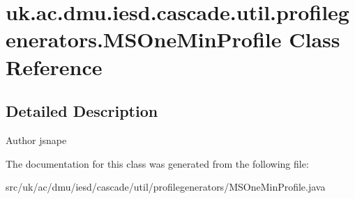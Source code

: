 \hypertarget{classuk_1_1ac_1_1dmu_1_1iesd_1_1cascade_1_1util_1_1profilegenerators_1_1_m_s_one_min_profile}{\section{uk.\-ac.\-dmu.\-iesd.\-cascade.\-util.\-profilegenerators.\-M\-S\-One\-Min\-Profile Class Reference}
\label{classuk_1_1ac_1_1dmu_1_1iesd_1_1cascade_1_1util_1_1profilegenerators_1_1_m_s_one_min_profile}
}


\subsection{Detailed Description}
\begin{DoxyAuthor}{Author}
jsnape 
\end{DoxyAuthor}


The documentation for this class was generated from the following file\-:\begin{DoxyCompactItemize}
\item 
src/uk/ac/dmu/iesd/cascade/util/profilegenerators/M\-S\-One\-Min\-Profile.\-java\end{DoxyCompactItemize}
